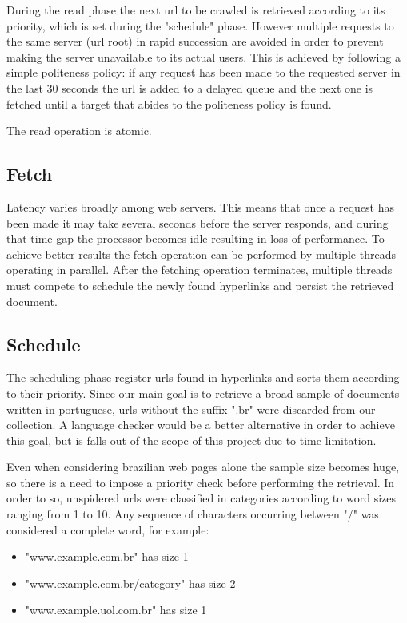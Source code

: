 \documentclass{acmart}
\begin{document}
During the read phase the next url to be crawled is retrieved according to its priority, which 
is set during the "schedule" phase. However multiple requests to the same server (url root) in rapid 
succession are avoided in order to prevent making the server unavailable to its actual users.
This is achieved by following a simple politeness policy: if any request has been made to the
requested server in the last 30 seconds the url is added to a delayed queue and the next one
is fetched until a target that abides to the politeness policy is found.

The read operation is atomic.

\subsection{Fetch}

Latency varies broadly among web servers. This means that once a request has been made it may 
take several seconds before the server responds, and during that time gap the processor becomes 
idle resulting in loss of performance. To achieve better results the fetch operation can be 
performed by multiple threads operating in parallel.
After the fetching operation terminates, multiple threads must compete to schedule the newly 
found hyperlinks and persist the retrieved document.

\subsection{Schedule}

The scheduling phase register urls found in hyperlinks and sorts them according to their priority.
Since our main goal is to retrieve a broad sample of documents written in portuguese, urls without 
the suffix ".br" were discarded from our collection. A language checker would be a better 
alternative in order to achieve this goal, but is falls out of the scope of this project due 
to time limitation.

Even when considering brazilian web pages alone the sample size becomes huge, so there is a need to 
impose a priority check before performing the retrieval. In order to so, unspidered urls
were classified in categories according to word sizes ranging from 1 to 10. Any sequence of 
characters occurring between "/" was considered a complete word, for example:

\begin{itemize}
\item "www.example.com.br" has size 1
\item "www.example.com.br/category" has size 2
\item "www.example.uol.com.br" has size 1
\end{itemize}
\end{document}
